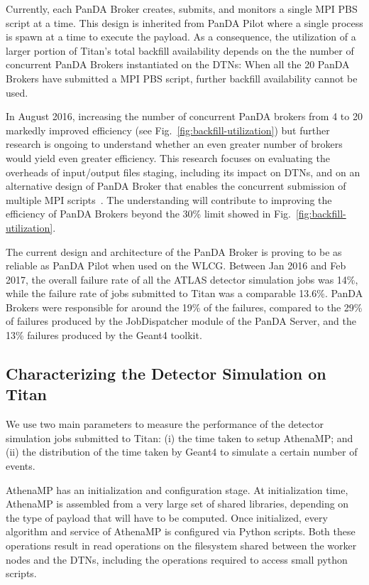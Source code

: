 Currently, each PanDA Broker creates, submits, and monitors a single MPI PBS
script at a time. This design is inherited from PanDA Pilot where a single
process is spawn at a time to execute the payload. As a consequence, the
utilization of a larger portion of Titan's total backfill availability
depends on the the number of concurrent PanDA Brokers instantiated on the
DTNs: When all the 20 PanDA Brokers have submitted a MPI PBS script, further
backfill availability cannot be used.

In August 2016, increasing the number of concurrent PanDA brokers from 4 to
20 markedly improved efficiency (see Fig.~\ref{fig:backfill-utilization}) but
further research is ongoing to understand whether an even greater number of
brokers would yield even greater efficiency. This research focuses on
evaluating the overheads of input/output files staging, including its impact
on DTNs, and on an alternative design of PanDA Broker that enables the
concurrent submission of multiple MPI scripts~\cite{barreiro2016panda}. The
understanding will contribute to improving the efficiency of PanDA Brokers
beyond the 30\% limit showed in Fig.~\ref{fig:backfill-utilization}.

The current design and architecture of the PanDA Broker is proving to be as
reliable as PanDA Pilot when used on the WLCG\@. Between Jan 2016 and Feb
2017, the overall failure rate of all the ATLAS detector simulation jobs was
14\%, while the failure rate of jobs submitted to Titan was a comparable
13.6\%. PanDA Brokers were responsible for around the 19\% of the failures,
compared to the 29\% of failures produced by the JobDispatcher module of the
PanDA Server, and the 13\% failures produced by the Geant4 toolkit. 

\subsection{Characterizing the Detector Simulation on
Titan}\label{ssec:athenamp_titan}

We use two main parameters to measure the performance of the detector
simulation jobs submitted to Titan: (i) the time taken to setup AthenaMP\@;
and (ii) the distribution of the time taken by Geant4 to simulate a certain
number of events.

AthenaMP has an initialization and configuration stage. At initialization
time, AthenaMP is assembled from a very large set of shared libraries,
depending on the type of payload that will have to be computed. Once
initialized, every algorithm and service of AthenaMP is configured via Python
scripts. Both these operations result in read operations on the filesystem
shared between the worker nodes and the DTNs, including the operations
required to access small python scripts.

